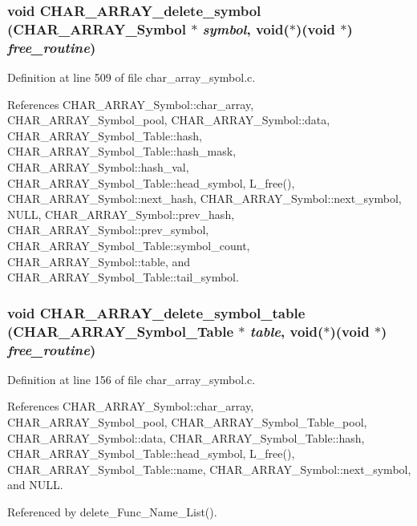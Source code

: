 \subsubsection{\setlength{\rightskip}{0pt plus 5cm}void CHAR\_\-ARRAY\_\-delete\_\-symbol (\bf{CHAR\_\-ARRAY\_\-Symbol} $\ast$ {\em symbol}, void($\ast$)(void $\ast$) {\em free\_\-routine})}\label{char__array__symbol_8c_8da46d556f8ea7dadcc01519f27ff54d}




Definition at line 509 of file char\_\-array\_\-symbol.c.

References CHAR\_\-ARRAY\_\-Symbol::char\_\-array, CHAR\_\-ARRAY\_\-Symbol\_\-pool, CHAR\_\-ARRAY\_\-Symbol::data, CHAR\_\-ARRAY\_\-Symbol\_\-Table::hash, CHAR\_\-ARRAY\_\-Symbol\_\-Table::hash\_\-mask, CHAR\_\-ARRAY\_\-Symbol::hash\_\-val, CHAR\_\-ARRAY\_\-Symbol\_\-Table::head\_\-symbol, L\_\-free(), CHAR\_\-ARRAY\_\-Symbol::next\_\-hash, CHAR\_\-ARRAY\_\-Symbol::next\_\-symbol, NULL, CHAR\_\-ARRAY\_\-Symbol::prev\_\-hash, CHAR\_\-ARRAY\_\-Symbol::prev\_\-symbol, CHAR\_\-ARRAY\_\-Symbol\_\-Table::symbol\_\-count, CHAR\_\-ARRAY\_\-Symbol::table, and CHAR\_\-ARRAY\_\-Symbol\_\-Table::tail\_\-symbol.
\subsubsection{\setlength{\rightskip}{0pt plus 5cm}void CHAR\_\-ARRAY\_\-delete\_\-symbol\_\-table (\bf{CHAR\_\-ARRAY\_\-Symbol\_\-Table} $\ast$ {\em table}, void($\ast$)(void $\ast$) {\em free\_\-routine})}\label{char__array__symbol_8c_623f7b33cd712a2c04b56b2eea7787e4}




Definition at line 156 of file char\_\-array\_\-symbol.c.

References CHAR\_\-ARRAY\_\-Symbol::char\_\-array, CHAR\_\-ARRAY\_\-Symbol\_\-pool, CHAR\_\-ARRAY\_\-Symbol\_\-Table\_\-pool, CHAR\_\-ARRAY\_\-Symbol::data, CHAR\_\-ARRAY\_\-Symbol\_\-Table::hash, CHAR\_\-ARRAY\_\-Symbol\_\-Table::head\_\-symbol, L\_\-free(), CHAR\_\-ARRAY\_\-Symbol\_\-Table::name, CHAR\_\-ARRAY\_\-Symbol::next\_\-symbol, and NULL.

Referenced by delete\_\-Func\_\-Name\_\-List().
